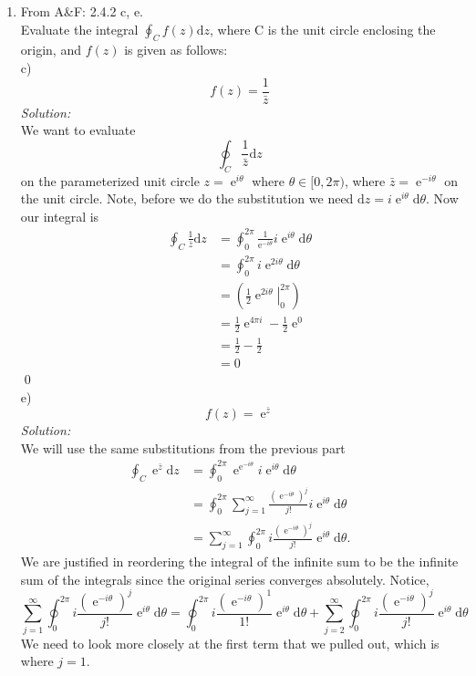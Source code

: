 \documentclass[10pt]{amsart}
\newcommand{\D}{\mathrm{d}}
\DeclareMathOperator{\E}{e}
\theoremstyle{nonumberplain}
\begin{document}
\begin{enumerate}[label={\bf {\arabic*}:}]
\item From A\&F: 2.4.2 c, e.\\
Evaluate the integral $\oint_Cf(z)\D z$, where C is the unit circle enclosing the origin, and $f(z)$ is given as follows: \\
c) $$f(z) = \frac {1} {\bar z}$$
\textit{Solution:} \\
We want to evaluate
$$
\oint_C\frac {1} {\bar z} \D z
$$
on the parameterized unit circle $z = \E^{i\theta}$ where $\theta \in [0, 2\pi)$, where $\bar z = \E^{-i\theta}$ on the unit circle.
Note, before we do the substitution we need $\D z = i\E^{i\theta} \D \theta$. Now our integral is
\begin{align*}
\oint_C\frac {1} {\bar z} \D z &= \oint_0^{2\pi}\frac {1} {\E^{-i\theta}} i\E^{i \theta}\D \theta \\
					  &= \oint_0^{2\pi} i \E^{2i \theta} \D \theta \\
					  &= \left( \left. \frac 1 2 \E^{2i\theta} \right|_0^{2\pi}\right) \\
					  &= \frac 1 2 \E^{4\pi i} - \frac 1 2 \E^{0} \\
					  &= \frac 1 2 - \frac 1 2 \\
					  &= 0
\end{align*}
\qed
\\
e) $$f(z) = \E^{\bar z}$$
\textit{Solution:} \\
We will use the same substitutions from the previous part
\begin{align*}
\oint_C\E^{\bar z} \D z &= \oint_0^{2\pi}\E^{\E^{-i\theta}} i\E^{i \theta}\D \theta \\
				  &= \oint_0^{2\pi} \sum_{j=1}^{\infty} \frac{\left(\E^{-i\theta}\right)^j}{j!} i\E^{i\theta} \D \theta \\
				  &= \sum_{j=1}^{\infty} \oint_0^{2\pi} i \frac{\left(\E^{-i\theta}\right)^j}{j!} {\E^{i\theta}} \D \theta.
\end{align*}
We are justified in reordering the integral of the infinite sum to be the infinite sum of the integrals since the original series converges absolutely.
Notice,
$$
\sum_{j=1}^{\infty} \oint_0^{2\pi} i \frac{\left(\E^{-i\theta}\right)^j}{j!} {\E^{i\theta}} \D \theta
= \oint_0^{2\pi} i \frac{\left(\E^{-i\theta}\right)^1}{1!} {\E^{i\theta}} \D \theta
+ \sum_{j=2}^{\infty} \oint_0^{2\pi} i \frac{\left(\E^{-i\theta}\right)^j}{j!} {\E^{i\theta}} \D \theta
$$
We need to look more closely at the first term that we pulled out, which is where $j=1$.

\end{enumerate}
\end{document}
